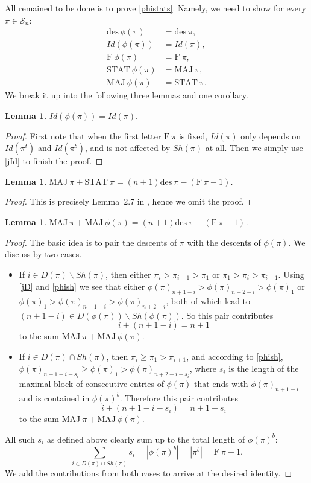 \documentclass[12pt]{amsart}
\numberwithin{equation}{section}
\theoremstyle{plain}
\newtheorem{lemma}[theorem]{Lemma}
\theoremstyle{definition}
\def\MAJ{\mathrm{MAJ}}
\def\STAT{\mathrm{STAT}}
\def\F{\mathrm{F}}
\def\des{\mathrm{des}}
\def\SS{\mathcal{S}}
\begin{document}
All remained to be done is to prove \eqref{phistats}. Namely, we need to show for every $\pi\in\SS_n$:
\begin{align*}
\des~\phi(\pi)&=\des~\pi,\\
Id(\phi(\pi))&=Id(\pi),\\
\F~\phi(\pi)&=\F~\pi,\\
\STAT~\phi(\pi)&=\MAJ~\pi,\\
\MAJ~\phi(\pi)&=\STAT~\pi.
\end{align*}
We break it up into the following three lemmas and one corollary.
\begin{lemma}
$Id(\phi(\pi))=Id(\pi).$
\end{lemma}
\begin{proof}
First note that when the first letter $\F~\pi$ is fixed, $Id(\pi)$ only depends on $Id(\pi^t)$ and $Id(\pi^b)$, and is not affected by $Sh(\pi)$ at all. Then we simply use \eqref{jId} to finish the proof.
\end{proof}

\begin{lemma}\label{M+S}
$\MAJ~\pi+\STAT~\pi=(n+1)\des~\pi-(\F~\pi-1)$.
\end{lemma}
\begin{proof}
This is precisely Lemma~2.7 in \cite{Bur}, hence we omit the proof.
\end{proof}

\begin{lemma}\label{M+M}
$\MAJ~\pi+\MAJ~\phi(\pi)=(n+1)\des~\pi-(\F~\pi-1)$.
\end{lemma}
\begin{proof}
The basic idea is to pair the descents of $\pi$ with the descents of $\phi(\pi)$. We discuss by two cases.
\begin{itemize}
\item If $i\in D(\pi)\backslash Sh(\pi)$, then either $\pi_i>\pi_{i+1}>\pi_1$ or $\pi_1>\pi_i>\pi_{i+1}$. Using \eqref{jD} and \eqref{phish} we see that either $\phi(\pi)_{n+1-i}>\phi(\pi)_{n+2-i}>\phi(\pi)_1$ or $\phi(\pi)_1>\phi(\pi)_{n+1-i}>\phi(\pi)_{n+2-i}$, both of which lead to $(n+1-i)\in D(\phi(\pi))\backslash Sh(\phi(\pi))$. So this pair contributes $$i+(n+1-i)=n+1$$ to the sum $\MAJ~\pi+\MAJ~\phi(\pi)$.
\item If $i\in D(\pi)\cap Sh(\pi)$, then $\pi_i\geq \pi_1>\pi_{i+1}$, and according to \eqref{phish}, $\phi(\pi)_{n+1-i-s_i}\geq \phi(\pi)_1>\phi(\pi)_{n+2-i-s_i}$, where $s_i$ is the length of the maximal block of consecutive entries of $\phi(\pi)$ that ends with $\phi(\pi)_{n+1-i}$ and is contained in $\phi(\pi)^b$. Therefore this pair contributes $$i+(n+1-i-s_i)=n+1-s_i$$ to the sum $\MAJ~\pi+\MAJ~\phi(\pi)$.
\end{itemize}
All such $s_i$ as defined above clearly sum up to the total length of $\phi(\pi)^b$:
$$
\sum_{i\in D(\pi)\cap Sh(\pi)}s_i=|\phi(\pi)^b|=|\pi^b|=\F~\pi-1.
$$
We add the contributions from both cases to arrive at the desired identity.
\end{proof}
\end{document}
